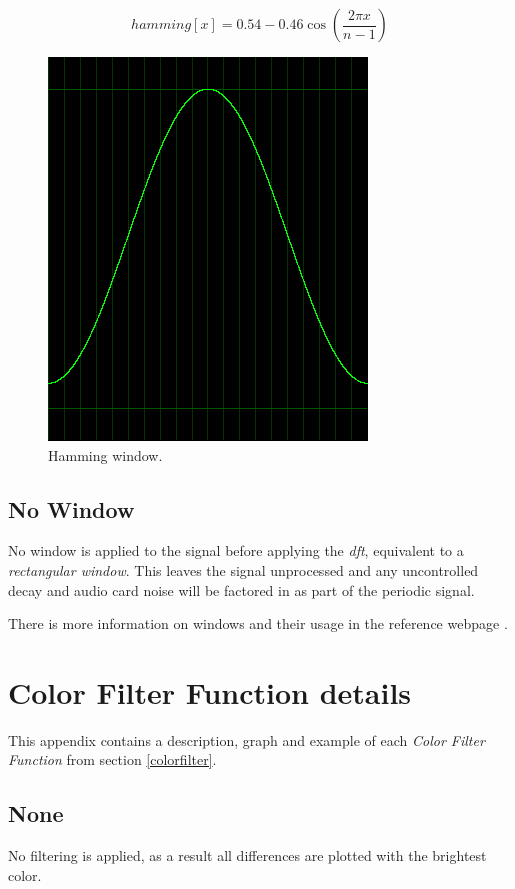 \documentclass[10pt,a4paper]{report}
\newcommand{\ac}[1]{\textit{\acrshort{#1}}}
\begin{document}
\begin{appendices}
\begin{equation}
hamming[x] = 0.54 - 0.46\cos(\frac{2\pi x}{n-1})
\end{equation}

\begin{figure}[H]
	\centering
	\includegraphics[width=0.4\linewidth]{images/windows/window-hamming.png}
	\caption[Hamming window]{Hamming window.}
	\label{fig:window-hamming}
\end{figure}

\section{No Window}

No window is applied to the signal before applying the \ac{dft}, equivalent to a \textit{rectangular window}. This leaves the signal unprocessed and any uncontrolled decay and audio card noise will be factored in as part of the periodic signal.

There is more information on windows and their usage in the reference webpage \cite{windowtypes}.

\chapter{Color Filter Function details}
\label{filterfunctions}

This appendix contains a description, graph and example of each \textit{Color Filter Function} from section \ref{colorfilter}.

\section{None} 

No filtering is applied, as a result all differences are plotted with the brightest color. 


\end{appendices}
\end{document}
